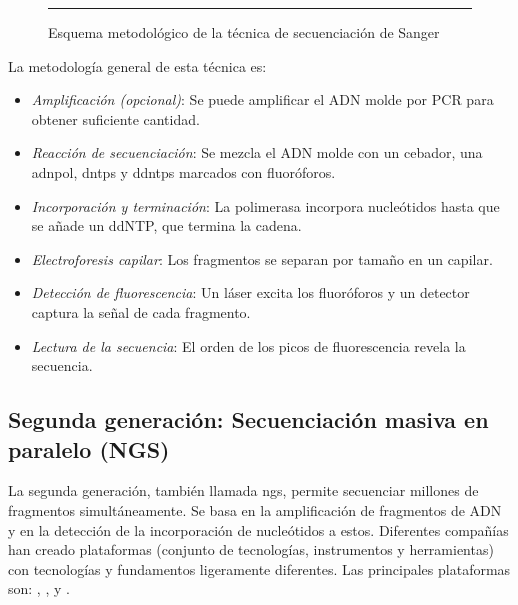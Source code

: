 \documentclass{AsignaturaResumen}
\begin{document}
\begin{figure}\centering
    \resizebox{\linewidth}{!}{}
    \rule{\linewidth}{0.5pt}
    \caption{Esquema metodológico de la técnica de secuenciación de Sanger}
    \label{fig:esquema_secuenciacion_g1_sanger}
\end{figure}

La metodología general de esta técnica es:

\begin{itemize}
    \item \emph{Amplificación (opcional)}: Se puede amplificar el ADN molde por PCR para obtener suficiente cantidad.
    \item \emph{Reacción de secuenciación}: Se mezcla el ADN molde con un cebador, una \acrlong{adnpol}, \acrshort{dntps} y \acrshort{ddntps} marcados con fluoróforos.
    \item \emph{Incorporación y terminación}: La polimerasa incorpora nucleótidos hasta que se añade un ddNTP, que termina la cadena.
    \item \emph{Electroforesis capilar}: Los fragmentos se separan por tamaño en un capilar.
    \item \emph{Detección de fluorescencia}: Un láser excita los fluoróforos y un detector captura la señal de cada fragmento.
    \item \emph{Lectura de la secuencia}: El orden de los picos de fluorescencia revela la secuencia.
\end{itemize}

    


\FloatBarrier
\subsection[Segunda generación]{Segunda generación: Secuenciación masiva en paralelo (NGS)}

La segunda generación, también llamada \acrfull{ngs}, permite secuenciar millones de fragmentos simultáneamente. Se basa en la amplificación de fragmentos de ADN y en la detección de la incorporación de nucleótidos a estos. Diferentes compañías han creado plataformas (conjunto de tecnologías, instrumentos y herramientas) con tecnologías y fundamentos ligeramente diferentes. Las principales plataformas son: \emph{}, \emph{}, \emph{} y \emph{} \citep{erenDNASequencingMethods2022}.
\end{document}
